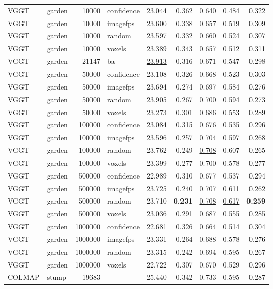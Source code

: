 \begin{table}[H]
\begin{tabular}{llrlrrrrr}
VGGT & garden & 10000 & confidence & 23.044 & 0.362 & 0.640 & 0.484 & 0.322 \\
VGGT & garden & 10000 & imagefps & 23.600 & 0.338 & 0.657 & 0.519 & 0.309 \\
VGGT & garden & 10000 & random & 23.597 & 0.332 & 0.660 & 0.524 & 0.307 \\
VGGT & garden & 10000 & voxels & 23.389 & 0.343 & 0.657 & 0.512 & 0.311 \\
VGGT & garden & 21147 & ba & \underline{23.913} & 0.316 & 0.671 & 0.547 & 0.298 \\
VGGT & garden & 50000 & confidence & 23.108 & 0.326 & 0.668 & 0.523 & 0.303 \\
VGGT & garden & 50000 & imagefps & 23.694 & 0.274 & 0.697 & 0.584 & 0.276 \\
VGGT & garden & 50000 & random & 23.905 & 0.267 & 0.700 & 0.594 & 0.273 \\
VGGT & garden & 50000 & voxels & 23.273 & 0.301 & 0.686 & 0.553 & 0.289 \\
VGGT & garden & 100000 & confidence & 23.084 & 0.315 & 0.676 & 0.535 & 0.296 \\
VGGT & garden & 100000 & imagefps & 23.596 & 0.257 & 0.704 & 0.597 & 0.268 \\
VGGT & garden & 100000 & random & 23.762 & 0.249 & \underline{0.708} & 0.607 & 0.265 \\
VGGT & garden & 100000 & voxels & 23.399 & 0.277 & 0.700 & 0.578 & 0.277 \\
VGGT & garden & 500000 & confidence & 22.989 & 0.310 & 0.677 & 0.537 & 0.294 \\
VGGT & garden & 500000 & imagefps & 23.725 & \underline{0.240} & 0.707 & 0.611 & 0.262 \\
VGGT & garden & 500000 & random & 23.710 & \textbf{0.231} & \underline{0.708} & \underline{0.617} & \textbf{0.259} \\
VGGT & garden & 500000 & voxels & 23.036 & 0.291 & 0.687 & 0.555 & 0.285 \\
VGGT & garden & 1000000 & confidence & 22.681 & 0.326 & 0.664 & 0.514 & 0.304 \\
VGGT & garden & 1000000 & imagefps & 23.331 & 0.264 & 0.688 & 0.578 & 0.276 \\
VGGT & garden & 1000000 & random & 23.315 & 0.242 & 0.694 & 0.595 & 0.267 \\
VGGT & garden & 1000000 & voxels & 22.722 & 0.307 & 0.670 & 0.529 & 0.296 \\
\midrule
COLMAP & stump & 19683 &  & 25.440 & 0.342 & 0.733 & 0.595 & 0.287 \\

\end{tabular}
\end{table}

